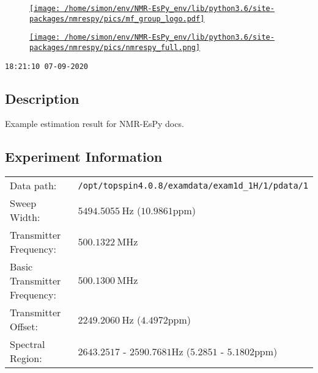\documentclass[8pt]{article}
\begin{document}
\begin{figure}[!ht]
\begin{minipage}[b][2.5cm][c]{.72\textwidth}
\href{http://foroozandeh.chem.ox.ac.uk/home}{\texttt{[image: /home/simon/env/NMR-EsPy\_env/lib/python3.6/site-packages/nmrespy/pics/mf\_group\_logo.pdf]}}
\end{minipage}
\begin{minipage}[b][2.5cm][c]{.27\textwidth}
\href{http://foroozandeh.chem.ox.ac.uk/home}{\texttt{[image: /home/simon/env/NMR-EsPy\_env/lib/python3.6/site-packages/nmrespy/pics/nmrespy\_full.png]}}
\end{minipage}
\end{figure}
\texttt{18:21:10
07-09-2020}
\subsection*{Description}
Example estimation result for NMR-EsPy docs.
\subsection*{Experiment Information}
\hspace{-6pt}\begin{tabular}{ll}
Data path: & \texttt{/opt/topspin4.0.8/examdata/exam1d\_1H/1/pdata/1} \\
Sweep Width: & $\SI{5494.5055}{\hertz}$ ($10.9861$ppm) \\
Transmitter Frequency: & $\SI{500.1322}{\mega\hertz}$ \\
Basic Transmitter Frequency: & $\SI{500.1300}{\mega\hertz}$ \\
Transmitter Offset: & $\SI{2249.2060}{\hertz}$ ($4.4972$ppm) \\
Spectral Region: & $ 2643.2517$ - $2590.7681\si{\hertz}$ ($5.2851$ - $5.1802$ppm)
\end{tabular}
\end{document}
